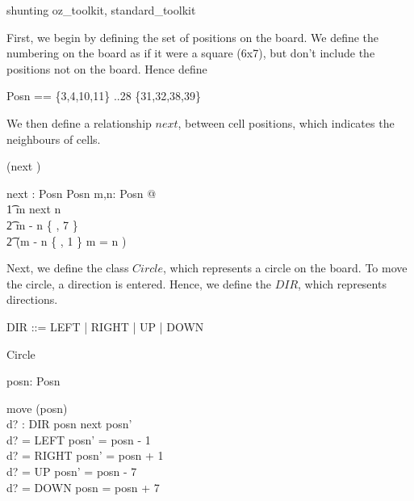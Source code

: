 \documentclass[11pt,a4paper]{article}
\begin{document}
\noindent

\begin{zsection}
  \SECTION shunting \parents oz\_toolkit, standard\_toolkit
\end{zsection}

First, we begin by defining the set of positions on the board. We define
the numbering on the board as if it were a square (6x7), but don't include
the positions not on the board. Hence define
\begin{zed}
  Posn == \{3,4,10,11\} ..28 \cup \{31,32,38,39\}
\end{zed}

We then define a relationship $next$, between cell positions, which
indicates the neighbours of cells.
\begin{zed}
 \relation (\varg next \varg)
\end{zed}

\begin{axdef}
  \varg next \varg : Posn \rel Posn
\where
  \forall m,n: Posn @ \\
    \t1 m next n \iff \\
       \t2 m - n \in \{ , 7 \} \lor \\
       \t2 (m - n \in \{  , 1 \} \land m  = n )
\end{axdef}

Next, we define the class $Circle$, which represents a circle on the
board. To move the circle, a direction is entered. Hence, we define the
$DIR$, which represents directions.

\begin{zed}
  DIR ::= LEFT | RIGHT | UP | DOWN
\end{zed}

\begin{class}{Circle}
\also
\begin{state}
  posn: Posn
\end{state} 
\begin{schema}{move}
  \Delta(posn) \\
  d? : DIR
\where
  posn next posn' \\
  d? = LEFT \implies posn' = posn - 1 \\
  d? = RIGHT \implies posn' = posn + 1 \\
  d? = UP \implies posn' = posn - 7 \\
  d? = DOWN \implies posn = posn + 7 \\
\end{schema}
\end{class}
\end{document}
